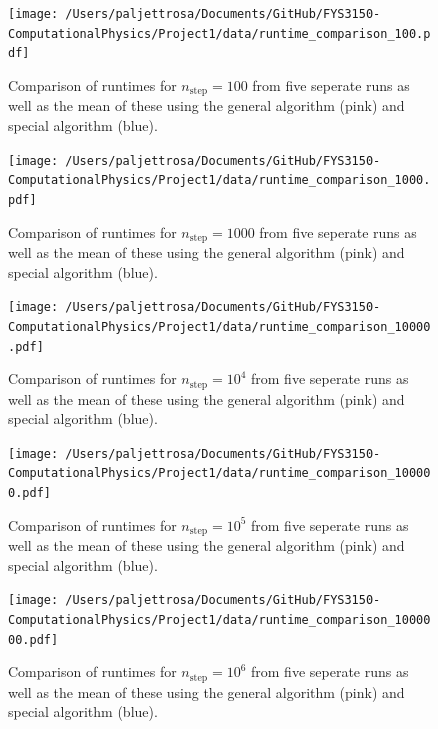 \documentclass[english,notitlepage]{revtex4-1}  %
\begin{document}
\begin{figure}[h!]
    \centering 
    \texttt{[image: /Users/paljettrosa/Documents/GitHub/FYS3150-ComputationalPhysics/Project1/data/runtime\_comparison\_100.pdf]} %
    \caption{Comparison of runtimes for $n_\text{step} = 100$ from five seperate runs as well as the mean of these using the general algorithm (pink) and special algorithm (blue).}
    \label{timing 2}
\end{figure}

\begin{figure}[h!]
    \centering 
    \texttt{[image: /Users/paljettrosa/Documents/GitHub/FYS3150-ComputationalPhysics/Project1/data/runtime\_comparison\_1000.pdf]} %
    \caption{Comparison of runtimes for $n_\text{step} = 1000$ from five seperate runs as well as the mean of these using the general algorithm (pink) and special algorithm (blue).}
    \label{timing 3}
\end{figure}

\begin{figure}[h!]
    \centering 
    \texttt{[image: /Users/paljettrosa/Documents/GitHub/FYS3150-ComputationalPhysics/Project1/data/runtime\_comparison\_10000.pdf]} %
    \caption{Comparison of runtimes for $n_\text{step} = 10^4$ from five seperate runs as well as the mean of these using the general algorithm (pink) and special algorithm (blue).}
    \label{timing 4}
\end{figure}

\begin{figure}[h!]
    \centering 
    \texttt{[image: /Users/paljettrosa/Documents/GitHub/FYS3150-ComputationalPhysics/Project1/data/runtime\_comparison\_100000.pdf]} %
    \caption{Comparison of runtimes for $n_\text{step} = 10^5$ from five seperate runs as well as the mean of these using the general algorithm (pink) and special algorithm (blue).}
    \label{timing 5}
\end{figure}

\begin{figure}[h!]
    \centering 
    \texttt{[image: /Users/paljettrosa/Documents/GitHub/FYS3150-ComputationalPhysics/Project1/data/runtime\_comparison\_1000000.pdf]} %
    \caption{Comparison of runtimes for $n_\text{step} = 10^6$ from five seperate runs as well as the mean of these using the general algorithm (pink) and special algorithm (blue).}
    \label{timing 6}
\end{figure}

   
\end{document}

